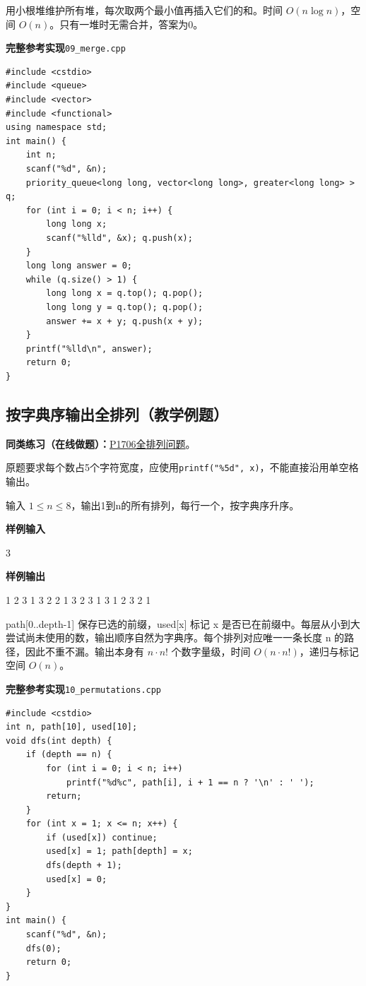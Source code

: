 \documentclass[UTF8,11pt,a4paper,fontset=none]{ctexart}
\newcommand{\practice}[2]{\par\noindent\textbf{同类练习（在线做题）：}\href{https://www.luogu.com.cn/problem/#1}{#1\quad #2}。\par}
\begin{document}
用小根堆维护所有堆，每次取两个最小值再插入它们的和。时间 $O(n\log n)$，空间 $O(n)$。只有一堆时无需合并，答案为0。
\par\noindent\begin{minipage}{\linewidth}
\textbf{完整参考实现}\quad\texttt{09\_merge.cpp}
\begin{lstlisting}
#include <cstdio>
#include <queue>
#include <vector>
#include <functional>
using namespace std;
int main() {
    int n;
    scanf("%d", &n);
    priority_queue<long long, vector<long long>, greater<long long> > q;
    for (int i = 0; i < n; i++) {
        long long x;
        scanf("%lld", &x); q.push(x);
    }
    long long answer = 0;
    while (q.size() > 1) {
        long long x = q.top(); q.pop();
        long long y = q.top(); q.pop();
        answer += x + y; q.push(x + y);
    }
    printf("%lld\n", answer);
    return 0;
}
\end{lstlisting}
\end{minipage}\par

\subsection{按字典序输出全排列（教学例题）}

\practice{P1706}{全排列问题}
原题要求每个数占5个字符宽度，应使用\texttt{printf("\%5d", x)}，不能直接沿用单空格输出。

输入 $1\le n\le8$，输出1到n的所有排列，每行一个，按字典序升序。
\begin{tcolorbox}[samplebox,title={输入输出样例}]
\textbf{样例输入}
\begin{Sample}
3
\end{Sample}
\tcblower
\textbf{样例输出}
\begin{Sample}
1 2 3
1 3 2
2 1 3
2 3 1
3 1 2
3 2 1
\end{Sample}
\end{tcolorbox}
path[0..depth-1] 保存已选的前缀，used[x] 标记 x 是否已在前缀中。每层从小到大尝试尚未使用的数，输出顺序自然为字典序。每个排列对应唯一一条长度 n 的路径，因此不重不漏。输出本身有 $n\cdot n!$ 个数字量级，时间 $O(n\cdot n!)$，递归与标记空间 $O(n)$。
\par\noindent\begin{minipage}{\linewidth}
\textbf{完整参考实现}\quad\texttt{10\_permutations.cpp}
\begin{lstlisting}
#include <cstdio>
int n, path[10], used[10];
void dfs(int depth) {
    if (depth == n) {
        for (int i = 0; i < n; i++)
            printf("%d%c", path[i], i + 1 == n ? '\n' : ' ');
        return;
    }
    for (int x = 1; x <= n; x++) {
        if (used[x]) continue;
        used[x] = 1; path[depth] = x;
        dfs(depth + 1);
        used[x] = 0;
    }
}
int main() {
    scanf("%d", &n);
    dfs(0);
    return 0;
}
\end{lstlisting}
\end{minipage}\par
\end{document}
